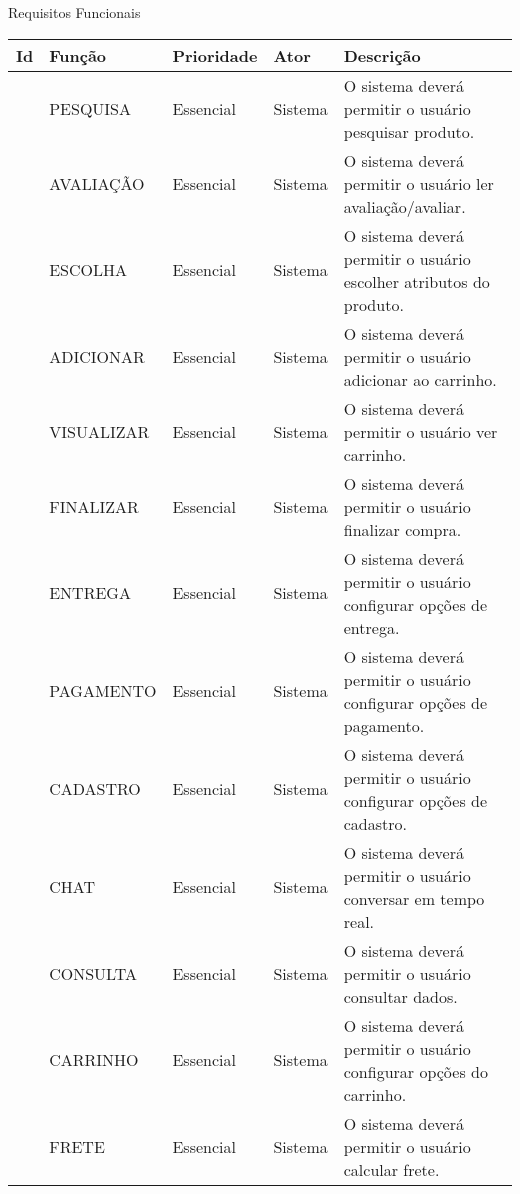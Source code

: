 \documentclass[
	12pt,				%
	openright,			%
	twoside,			%
	a4paper,			%
	english,			%
	brazil				%
	]{abntex2}
\begin{document}
\begin{quadro}[htb]
	\caption{\label{quadro_rf}Requisitos Funcionais}
	\begin{adjustbox}{center}
		\begin{tabular}{|p{2cm}|p{4cm}|p{4cm}|p{2cm}|p{5cm}|}
			\hline
			\textbf{Id} & \textbf{Função} & \textbf{Prioridade} & \textbf{Ator} & \textbf{Descrição} \\ \hline
			[RF001] & PESQUISA & Essencial & Sistema & O sistema deverá permitir o usuário pesquisar produto. \\ \hline
			[RF002] & AVALIAÇÃO & Essencial & Sistema & O sistema deverá permitir o usuário ler avaliação/avaliar. \\ \hline
			[RF003] & ESCOLHA & Essencial & Sistema & O sistema deverá permitir o usuário escolher atributos do produto. \\ \hline
			[RF004] & ADICIONAR & Essencial & Sistema & O sistema deverá permitir o usuário adicionar ao carrinho. \\ \hline
			[RF005] & VISUALIZAR & Essencial & Sistema & O sistema deverá permitir o usuário ver carrinho. \\ \hline
			[RF006] & FINALIZAR & Essencial & Sistema & O sistema deverá permitir o usuário finalizar compra. \\ \hline
			[RF007] & ENTREGA & Essencial & Sistema & O sistema deverá permitir o usuário configurar opções de entrega. \\ \hline
			[RF008] & PAGAMENTO & Essencial & Sistema & O sistema deverá permitir o usuário configurar opções de pagamento. \\ \hline
			[RF009] & CADASTRO & Essencial & Sistema & O sistema deverá permitir o usuário configurar opções de cadastro. \\ \hline
			[RF010] & CHAT & Essencial & Sistema & O sistema deverá permitir o usuário conversar em tempo real. \\ \hline
			[RF011] & CONSULTA & Essencial & Sistema & O sistema deverá permitir o usuário consultar dados. \\ \hline
			[RF012] & CARRINHO & Essencial & Sistema & O sistema deverá permitir o usuário configurar opções do carrinho. \\ \hline
			[RF013] & FRETE & Essencial & Sistema & O sistema deverá permitir o usuário calcular frete. \\ \hline
		\end{tabular}
	\end{adjustbox}
\end{quadro}
\end{document}
